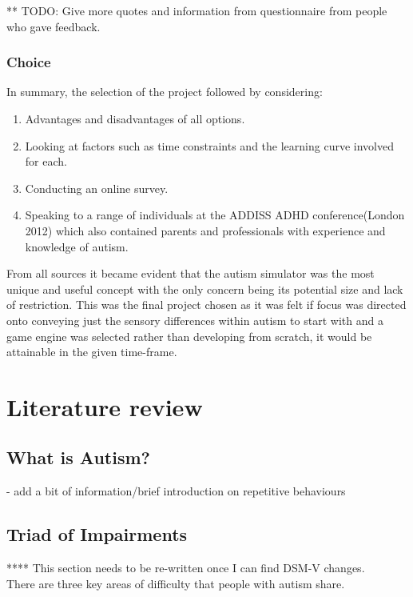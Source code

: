 \documentclass[11pt]{report}
\begin{document}
** TODO: Give more quotes and information from questionnaire from people who gave feedback.

\subsection{Choice}

In summary, the selection of the project followed by considering:

\begin{enumerate}
\item Advantages and disadvantages of all options.
\item Looking at factors such as time constraints and the learning curve involved for each.
\item Conducting an online survey.
\item Speaking to a range of individuals at the ADDISS ADHD conference(London 2012) which also contained parents and professionals with experience and knowledge of autism.
\end{enumerate}

From all sources it became evident that the autism simulator was the most unique and useful concept with the only concern being its potential size and lack of restriction. This was the final project chosen as it was felt
if focus was directed onto conveying just the sensory differences within autism to start with and a game engine was selected rather than developing from scratch, it would be attainable in the given time-frame.

\chapter{Literature review}

\section{What is Autism?}



- add a bit of information/brief introduction on repetitive behaviours


\section{Triad of Impairments}

**** This section needs to be re-written once I can find DSM-V changes. \\

There are three key areas of difficulty that people with autism share.
\end{document}
